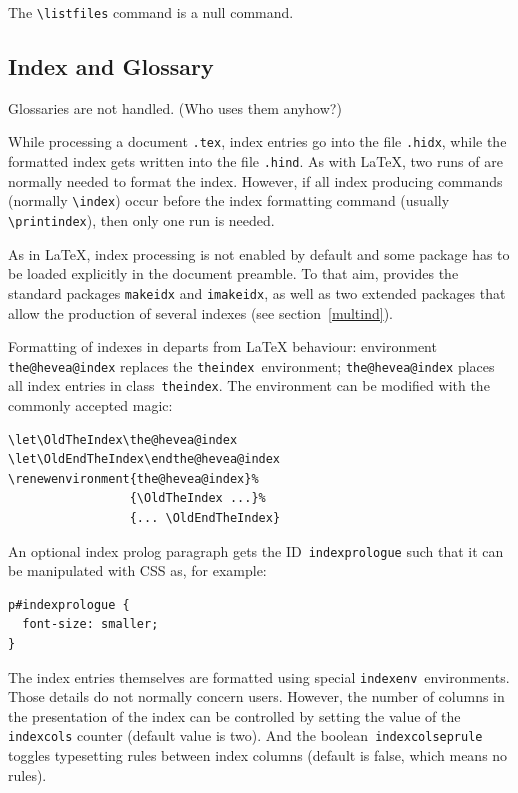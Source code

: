 The \verb+\listfiles+ command is a null command.


\subsection{Index and Glossary}\label{index}
Glossaries are not handled.  (Who uses them anyhow?)

While processing a document \texttt{.tex}, index
entries go into the file \texttt{.hidx}, while
the formatted index gets written into the file
\texttt{.hind}.
As with \LaTeX{}, two runs of \hevea{} are normally needed to format
the index.
However, if all index producing commands (normally \verb+\index+)
occur before the index formatting command (usually
\verb+\printindex+), then only one run is needed.

As in \LaTeX, index processing is not enabled by default and
some  package has to be loaded explicitly in the
document preamble.
To that aim, \hevea{} provides the standard packages \texttt{makeidx}
and \texttt{imakeidx}, as well as
two extended packages that allow the production of several indexes
(see section~\ref{multind}).

Formatting of indexes in \hevea{} departs from \LaTeX{} behaviour:
environment \verb+the@hevea@index+ replaces
the \verb+theindex+~environment; \verb+the@hevea@index+ places all
index entries in class~\verb+theindex+.  The environment can be
modified with the commonly accepted magic:

\begin{verbatim}
\let\OldTheIndex\the@hevea@index
\let\OldEndTheIndex\endthe@hevea@index
\renewenvironment{the@hevea@index}%
                 {\OldTheIndex ...}%
                 {... \OldEndTheIndex}
\end{verbatim}

\noindent An optional index prolog paragraph gets the
ID~\verb+indexprologue+ such that it can be manipulated with CSS as,
for example:

\begin{verbatim}
p#indexprologue {
  font-size: smaller;
}
\end{verbatim}

\noindent The index entries themselves are formatted using special
\texttt{indexenv}~environments.
Those details do not normally concern users.  However, the number of
columns in the presentation of the index can be controlled by setting
the value of the \texttt{indexcols} counter (default value is two).
And the boolean~\texttt{indexcolseprule} toggles typesetting rules
between index columns (default is false, which means no rules).

